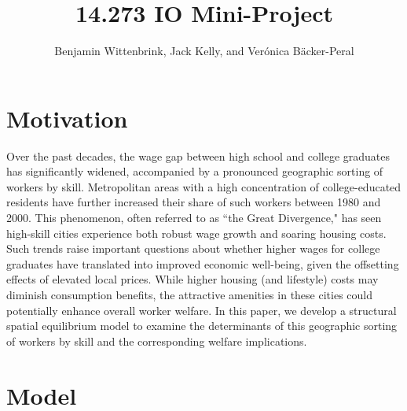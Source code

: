 \documentclass{article}
\title{14.273 IO Mini-Project}
\author{Benjamin Wittenbrink, Jack Kelly, and Verónica Bäcker-Peral}
\begin{document}
\maketitle

\section{Motivation}

Over the past decades, the wage gap between high school and college graduates has significantly widened, accompanied by a pronounced geographic sorting of workers by skill. Metropolitan areas with a high concentration of college-educated residents have further increased their share of such workers between 1980 and 2000. This phenomenon, often referred to as ``the Great Divergence," has seen high-skill cities experience both robust wage growth and soaring housing costs. Such trends raise important questions about whether higher wages for college graduates have translated into improved economic well-being, given the offsetting effects of elevated local prices. While higher housing (and lifestyle) costs may diminish consumption benefits, the attractive amenities in these cities could potentially enhance overall worker welfare. In this paper, we develop a structural spatial equilibrium model to examine the determinants of this geographic sorting of workers by skill and the corresponding welfare implications. 



\section{Model}
\end{document}
